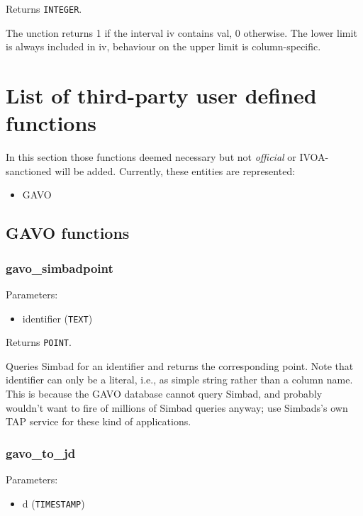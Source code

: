 \documentclass[11pt,a4paper]{ivoa}
\begin{document}
Returns \texttt{INTEGER}.

The unction returns 1 if the interval iv contains val, 0 otherwise. The
lower limit is always included in iv, behaviour on the upper limit is
column-specific.


\section{List of third-party user defined functions}

In this section those functions deemed necessary but not
\textit{official} or IVOA-sanctioned will be added. Currently, these
entities are represented:

\begin{itemize}
	\item{GAVO}
\end{itemize}

\subsection{GAVO functions}

\subsubsection{gavo\_simbadpoint}

Parameters:

\begin{itemize}
	\item identifier (\texttt{TEXT})
\end{itemize}

Returns \texttt{POINT}.

Queries Simbad for an identifier and returns the corresponding point.
Note that identifier can only be a literal, i.e., as simple string
rather than a column name. This is because the GAVO database cannot
query Simbad, and probably wouldn't want to fire of millions of Simbad
queries anyway; use Simbads's own TAP service for these kind of
applications.

\subsubsection{gavo\_to\_jd}

Parameters:

\begin{itemize}
	\item d (\texttt{TIMESTAMP})
\end{itemize}
\end{document}
